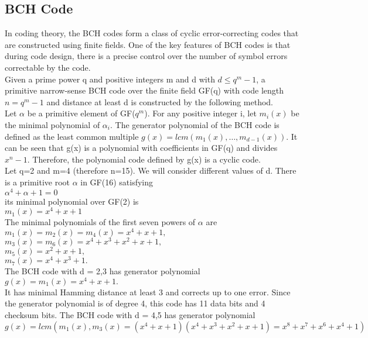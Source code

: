 \documentclass[12pt,a4paper]{report}
\begin{document}
\subsection{BCH Code}
In coding theory, the BCH \cite{ImranAl-ArsGaydadjiev} codes form a class of cyclic error-correcting codes that are constructed using finite fields. One of the key features of BCH codes is that during code design, there is a precise control over the number of symbol errors correctable by the code.\\
Given a prime power q and positive integers m and d with $d \leq q^m - 1$, a primitive narrow-sense BCH code over the finite field GF(q) with code length $n = q^m - 1$ and distance at least d is constructed by the following method.\\

Let $\alpha$ be a primitive element of GF($q^m$). For any positive integer i, let $m_i(x)$ be the minimal polynomial of $\alpha_i$. The generator polynomial of the BCH code is defined as the least common multiple $g(x) = lcm(m_1(x),…,m_{d-1}(x))$. It can be seen that g(x) is a polynomial with coefficients in GF(q) and divides $x^n - 1$. Therefore, the polynomial code defined by g(x) is a cyclic code.\\
Let q=2 and m=4 (therefore n=15). We will consider different values of d. There is a primitive root $\alpha$ in GF(16) satisfying\\
 $\alpha^4 + \alpha + 1 = 0$\\
its minimal polynomial over GF(2) is\\
$ m_1(x) = x^4 + x + 1 $\\
The minimal polynomials of the first seven powers of $\alpha$ are\\
$m_1(x) = m_2(x) = m_4(x) = x^4 + x + 1,$\\
$m_3(x) = m_6(x) = x^4 + x^3 + x^2 + x + 1,$\\
$m_5(x) = x^2 + x + 1,$\\
$m_7(x) = x^4 + x^3 + 1.$\\
The BCH code with d = 2,3 has generator polynomial\\
$g(x) = m_1(x) = x^4 + x +1.$\\
It has minimal Hamming distance at least 3 and corrects up to one error. Since the generator polynomial is of degree 4, this code has 11 data bits and 4 checksum bits.
The BCH code with d = 4,5 has generator polynomial
$g(x) = lcm(m_1(x),m_3(x) = (x^4 + x + 1)(x^4 + x^3 + x^2 + x + 1) = x^8 + x^7 + x^6 + x^4 + 1 )$\\
\end{document}
